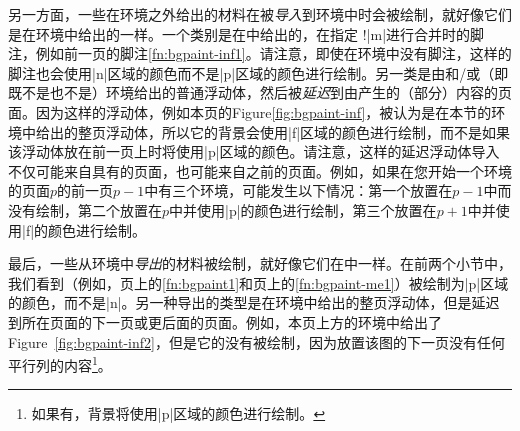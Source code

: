 另一方面，一些在环境之外给出的材料在被\emph{导入}到环境中时会被绘制，就好像它们是在环境中给出的一样。一个类别是在\preenv{}中给出的，在指定 \!\footnotelayout!|{m}|进行合并时的脚注，例如前一页的脚注\ref{fn:bgpaint-inf1}。请注意，即使在环境中没有脚注，这样的脚注也会使用|n|区域的颜色而不是|p|区域的颜色进行绘制。另一类是由和/或（即既不是也不是）环境给出的普通浮动体，然后被\emph{延迟}到由产生的（部分）内容的页面。因为这样的浮动体，例如本页的Figure\Tie\ref{fig:bgpaint-inf}，被认为是在本节的环境中给出的整页浮动体，所以它的背景会使用|f|区域的颜色进行绘制，而不是如果该浮动体放在前一页上时将使用|p|区域的颜色。请注意，这样的延迟浮动体导入不仅可能来自具有\beginparacol{}的页面，也可能来自之前的页面。例如，如果在您开始一个环境的页面$p$的前一页$p-1$中有三个环境，可能发生以下情况：第一个放置在$p-1$中而没有绘制，第二个放置在$p$中并使用|p|的颜色进行绘制，第三个放置在$p+1$中并使用|f|的颜色进行绘制。

% 

最后，一些从环境中\emph{导出}的材料被绘制，就好像它们在\postenv{}中一样。在前两个小节中，我们看到\Mgfnote{}（例如，\pageref{fn:bgpaint1}页上的\ref{fn:bgpaint1}和\pageref{fn:bgpaint-me1}页上的\ref{fn:bgpaint-me1}）被绘制为|p|区域的颜色，而不是|n|。另一种导出的类型是在环境中给出的整页浮动体，但是延迟到\Endparacol{}所在页面的下一页或更后面的页面。例如，本页上方的环境中给出了Figure~\ref{fig:bgpaint-inf2}，但是它的\bground{}没有被绘制，因为放置该图的下一页没有任何平行列的内容\footnote{如果有，背景将使用|p|区域的颜色进行绘制。}。

